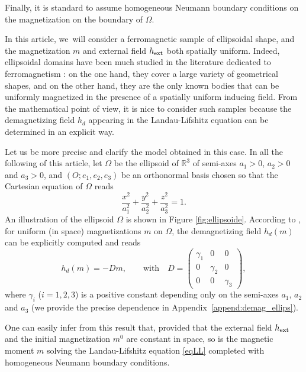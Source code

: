 \documentclass[JEP,XML,SOM,Unicode,NoEqCountersInSection,NoFloatCountersInSection,published]{cedram}
\theoremstyle{definition}
\newcommand{\R} {\mathbb{R}}
\begin{document}
Finally, it is standard to assume homogeneous Neumann boundary conditions on the magnetization on the boundary of $\Omega$.

In this article, we~will consider a ferromagnetic sample of ellipsoidal shape, and the magnetization $m$ and external field $h_{\rm ext}$ both spatially uniform. Indeed, ellipsoidal domains have been much studied in the literature dedicated to ferromagnetism \hbox{\cite{osborn1945demagnetizing,di2016newtonian,takahashi2017ellipsoids}}: on the one hand, they cover a large variety of geometrical shapes, and on the other hand, they are the only known bodies that can be uniformly magnetized in the presence of a spatially uniform inducing field. From the mathematical point of view, it is nice to consider such samples because the demagnetizing field $h_d$ appearing in the Landau-Lifshitz equation can be determined in an explicit way.

Let us be more precise and clarify the model obtained in this case. In all the following of this article, let $\Omega$ be the ellipsoid of $\R^3$ of semi-axes $a_1>0$, $a_2>0$ and $a_3>0$, and $(O;e_1,e_2,e_3)$ be an orthonormal basis chosen so that the Cartesian equation of $\Omega$ reads
\begin{equation}\label{eq_ellips}
\frac{x^2}{a_1^2}+\frac{y^2}{a_2^2}+\frac{z^2}{a_3^2}=1.
\end{equation}
An illustration of the ellipsoid $\Omega$ is shown in Figure \ref{fig:ellipsoide}.
According to \cite{osborn1945demagnetizing,di2016newtonian}, for uniform (in space) magnetizations $m$ on $\Omega$, the demagnetizing field $h_d(m)$ can be explicitly computed and reads
\[
h_d(m)=-Dm, \qquad\text{with}\quad D=\begin{pmatrix}
\gamma_1 & 0 & 0\\
0 & \gamma_2 & 0\\
0 & 0 & \gamma_3
\end{pmatrix} ,
\]
where $\gamma_i$ ($i=1,2,3$) is a positive constant depending only on the semi-axes $a_1$, $a_2$ and $a_3$ (we provide the precise dependence in Appendix~\ref{append:demag_ellips}).

One can easily infer from this result that, provided that the external field $h_{\rm ext}$ and the initial magnetization $m^0$ are constant in space, so is the magnetic moment $m$ solving the Landau-Lifshitz equation \eqref{eqLL} completed with homogeneous Neumann boundary conditions.
\end{document}
